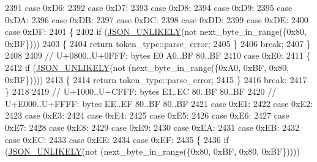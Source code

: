 \begin{DoxyCode}
2391                 \textcolor{keywordflow}{case} 0xD6:
2392                 \textcolor{keywordflow}{case} 0xD7:
2393                 \textcolor{keywordflow}{case} 0xD8:
2394                 \textcolor{keywordflow}{case} 0xD9:
2395                 \textcolor{keywordflow}{case} 0xDA:
2396                 \textcolor{keywordflow}{case} 0xDB:
2397                 \textcolor{keywordflow}{case} 0xDC:
2398                 \textcolor{keywordflow}{case} 0xDD:
2399                 \textcolor{keywordflow}{case} 0xDE:
2400                 \textcolor{keywordflow}{case} 0xDF:
2401                 \{
2402                     \textcolor{keywordflow}{if} (\hyperlink{json_8hpp_ab77582407c64944e7db1ea95ab520253}{JSON\_UNLIKELY}(not next\_byte\_in\_range(\{0x80, 0xBF\})))
2403                     \{
2404                         \textcolor{keywordflow}{return} token\_type::parse\_error;
2405                     \}
2406                     \textcolor{keywordflow}{break};
2407                 \}
2408 
2409                 \textcolor{comment}{// U+0800..U+0FFF: bytes E0 A0..BF 80..BF}
2410                 \textcolor{keywordflow}{case} 0xE0:
2411                 \{
2412                     \textcolor{keywordflow}{if} (\hyperlink{json_8hpp_ab77582407c64944e7db1ea95ab520253}{JSON\_UNLIKELY}(not (next\_byte\_in\_range(\{0xA0, 0xBF, 0x80, 0xBF\}))))
2413                     \{
2414                         \textcolor{keywordflow}{return} token\_type::parse\_error;
2415                     \}
2416                     \textcolor{keywordflow}{break};
2417                 \}
2418 
2419                 \textcolor{comment}{// U+1000..U+CFFF: bytes E1..EC 80..BF 80..BF}
2420                 \textcolor{comment}{// U+E000..U+FFFF: bytes EE..EF 80..BF 80..BF}
2421                 \textcolor{keywordflow}{case} 0xE1:
2422                 \textcolor{keywordflow}{case} 0xE2:
2423                 \textcolor{keywordflow}{case} 0xE3:
2424                 \textcolor{keywordflow}{case} 0xE4:
2425                 \textcolor{keywordflow}{case} 0xE5:
2426                 \textcolor{keywordflow}{case} 0xE6:
2427                 \textcolor{keywordflow}{case} 0xE7:
2428                 \textcolor{keywordflow}{case} 0xE8:
2429                 \textcolor{keywordflow}{case} 0xE9:
2430                 \textcolor{keywordflow}{case} 0xEA:
2431                 \textcolor{keywordflow}{case} 0xEB:
2432                 \textcolor{keywordflow}{case} 0xEC:
2433                 \textcolor{keywordflow}{case} 0xEE:
2434                 \textcolor{keywordflow}{case} 0xEF:
2435                 \{
2436                     \textcolor{keywordflow}{if} (\hyperlink{json_8hpp_ab77582407c64944e7db1ea95ab520253}{JSON\_UNLIKELY}(not (next\_byte\_in\_range(\{0x80, 0xBF, 0x80, 0xBF\}))))

\end{DoxyCode}
